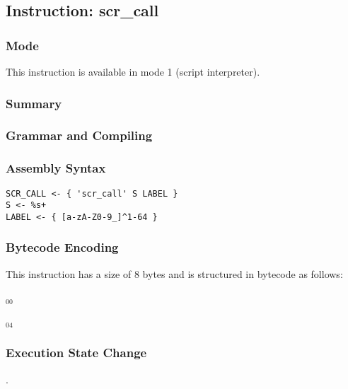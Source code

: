 \subsection{Instruction: scr\_call}

\subsubsection{Mode}
This instruction is available in mode 1 (script interpreter).
\subsubsection{Summary}


\subsubsection{Grammar and Compiling}


\subsubsection{Assembly Syntax}

\begin{myquote}
\begin{verbatim}
SCR_CALL <- { 'scr_call' S LABEL }
S <- %s+
LABEL <- { [a-zA-Z0-9_]^1-64 }
\end{verbatim}
\end{myquote}

\subsubsection{Bytecode Encoding}

This instruction has a size of 8 bytes and is structured in bytecode as follows:

$_{00}$\ 



$_{04}$\ 

\subsubsection{Execution State Change}

.


